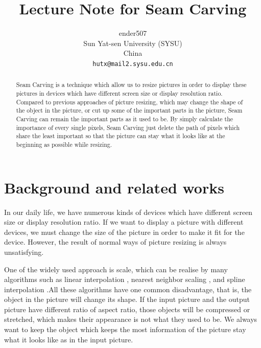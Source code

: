 \documentclass[final]{cvpr}
\begin{document}
\title{Lecture Note for Seam Carving}

\author{ender507\\
Sun Yat-sen University (SYSU)\\
China\\
{\tt\small hutx@mail2.sysu.edu.cn}
}

\maketitle


\begin{abstract}
   Seam Carving \cite{ref4} is a technique which allow us to resize pictures in order to display these pictures in devices which have different screen size or display resolution ratio. Compared to previous approaches of picture resizing, which may change the shape of the object in the picture, or cut up some of the important parts in the picture, Seam Carving can remain the important parts as it used to be. By simply calculate the importance of every single pixels, Seam Carving just delete the path of pixels which share the least important so that the picture can stay what it looks like at the beginning as possible while resizing.
\end{abstract}

\section{Background and related works}

 In our daily life, we have numerous kinds of devices which have different screen size or display resolution ratio. If we want to display a picture with different devices, we must change the size of the picture in order to make it fit for the device. However, the result of normal ways of picture resizing is always unsatisfying. 
 
 One of the widely used approach is scale, which can be realise by many algorithms such as linear interpolation \cite{ref1} , nearest neighbor scaling \cite{ref2} , and spline interpolation \cite{ref3} .All these algorithms have one common disadvantage, that is, the object in the picture will change its shape. If the input picture and the output picture have different ratio of aspect ratio, those objects will be compressed or stretched, which makes their appearance is not what they used to be. We always want to keep the object which keeps the most information of the picture stay what it looks like as in the input picture.
\end{document}

